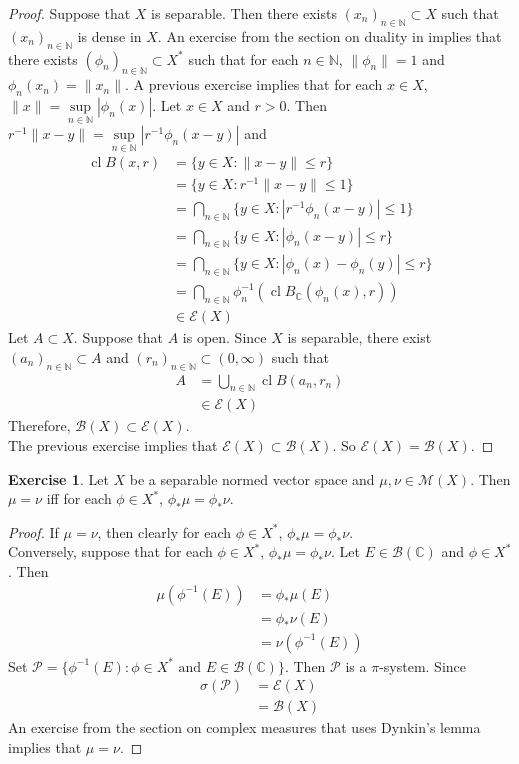 \documentclass[12pt]{amsart}
\theoremstyle{definition}
\newtheorem{ex}[definition]{Exercise}
\newcommand{\sig}{\sigma}
\newcommand{\C}{\mathbb{C}}
\newcommand{\N}{\mathbb{N}}
\newcommand{\MB}{\mathcal{B}}
\newcommand{\MP}{\mathcal{P}}
\newcommand{\ME}{\mathcal{E}}
\newcommand{\MM}{\mathcal{M}}
\DeclareMathOperator{\cl}{cl}
\begin{document}
	\begin{proof}
		Suppose that $X$ is separable. Then there exists $(x_n)_{n \in \N} \subset X$ such that $(x_n)_{n \in \N}$ is dense in $X$. An exercise from the section on duality in \cite{analysis} implies that there exists $(\phi_n)_{n \in \N} \subset X^*$ such that for each $n \in \N$, $\|\phi_n\| = 1$ and $\phi_n(x_n) = \|x_n\|$. A previous exercise implies that for each $x \in X$, $\|x\| = \sup\limits_{n \in \N} |\phi_n(x)|$. Let $x \in X$ and $r > 0$. Then $r^{-1}\|x - y \| = \sup\limits_{n \in \N} |r^{-1}\phi_n(x - y)|$ and 
		\begin{align*}
			\cl B(x,r)
			& = \{y \in X: \|x -y \| \leq r\} \\
			& = \{y \in X: r^{-1}\|x - y \| \leq 1\} \\
			& = \bigcap_{n \in \N} \{y \in X: |r^{-1}\phi_n(x - y)| \leq 1\} \\
			& = \bigcap_{n \in \N} \{y \in X: |\phi_n(x - y)| \leq r\} \\ 
			& = \bigcap_{n \in \N} \{y \in X: |\phi_n(x) - \phi_n(y)| \leq r\} \\
			& = \bigcap_{n \in \N} \phi_n^{-1}(\cl B_{\C}(\phi_n (x), r)) \\
			& \in \ME(X)
		\end{align*}
		Let $A \subset X$. Suppose that $A$ is open. Since $X$ is separable, there exist $(a_n)_{n \in \N} \subset A$ and $(r_n)_{n \in \N} \subset (0, \infty)$ such that 
		\begin{align*}
			A 
			& = \bigcup_{n \in \N} \cl B(a_n, r_n) \\
			& \in \ME(X)
		\end{align*}
		Therefore, $\MB(X) \subset \ME(X)$. \\
		The previous exercise implies that $\ME(X) \subset \MB(X)$. So $\ME(X) = \MB(X)$.
	\end{proof}
	
	\begin{ex}
		Let $X$ be a separable normed vector space and $\mu, \nu \in \MM(X)$. Then $\mu = \nu$ iff for each $\phi \in X^*$, $\phi_*\mu = \phi_*\nu$.
	\end{ex}
	
	\begin{proof}
		If $\mu = \nu$, then clearly for each $\phi \in X^*$, $\phi_*\mu = \phi_*\nu$. \\
		Conversely, suppose that for each $\phi \in X^*$, $\phi_*\mu = \phi_*\nu$. Let $E \in \MB(\C)$ and $\phi \in X^*$. Then 
		\begin{align*}
			\mu(\phi^{-1}(E)) 
			& = \phi_*\mu(E) \\
			& = \phi_*\nu(E) \\
			&= \nu(\phi^{-1}(E))
		\end{align*}
		Set $\MP = \{\phi^{-1}(E): \phi \in X^* \text{ and } E \in \MB(\C)\}$. Then $\MP$ is a $\pi$-system. Since 
		\begin{align*}
			\sig(\MP) 
			& = \ME(X) \\
			& = \MB(X)
		\end{align*}
		An exercise from the section on complex measures that uses Dynkin's lemma implies that $\mu = \nu$.
	\end{proof}
	
\end{document}
